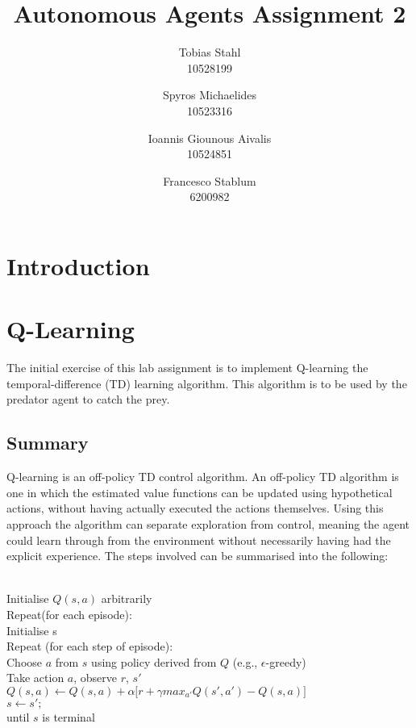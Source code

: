 \documentclass[11pt]{article}
\title{
	\textbf{Autonomous Agents Assignment 2}
}
\author{Tobias Stahl \\ 10528199 \and Spyros Michaelides \\ 10523316 \and Ioannis Giounous Aivalis \\ 10524851 \and Francesco Stablum \\ 6200982}
\begin{document}
\maketitle




\section{Introduction}



\section{Q-Learning}
The initial exercise of this lab assignment is to implement Q-learning the temporal-difference (TD) learning algorithm. This algorithm is to be used by the predator agent to catch the prey.



\subsection{Summary}
Q-learning is an off-policy TD control algorithm. An off-policy TD algorithm is one in which the estimated value functions can be updated using hypothetical actions, without having actually executed the actions themselves. Using this approach the algorithm can separate exploration from control, meaning the agent could learn through from the environment without necessarily having had the explicit experience.
The steps involved can be summarised into the following:\\\\

\pagebreak

\noindent Initialise $Q(s,a)$ arbitrarily\\
Repeat(for each episode):\\
\hspace*{10mm} Initialise s\\
\hspace*{10mm} Repeat (for each step of episode):\\
\hspace*{20mm} Choose $a$ from $s$ using policy derived from $Q$ (e.g., $\epsilon$-greedy)\\
\hspace*{20mm} Take action $a$, observe $r$, $s'$\\
\hspace*{20mm} $Q(s,a) \leftarrow Q(s,a) + \alpha \lbrack r + \gamma max_{a'} Q(s',a') - Q(s,a)\rbrack$\\
\hspace*{20mm} $s \leftarrow s';$\\
\hspace*{10mm} until $s$ is terminal\\
\end{document}
